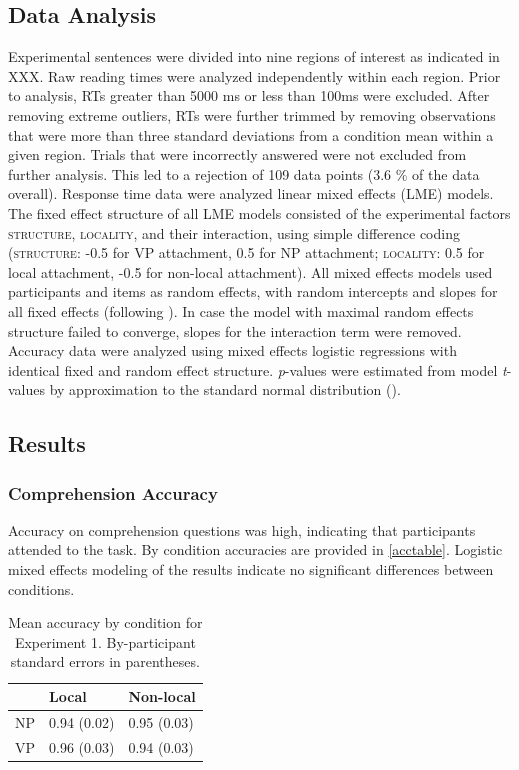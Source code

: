 \documentclass[12pt]{article}
\begin{document}
\subsection{Data Analysis}
\label{sec:analysis}

Experimental sentences were divided into nine regions of interest as indicated in XXX. Raw reading times were analyzed independently within each region. Prior to analysis, RTs greater than 5000 ms or less than 100ms were excluded. After removing extreme outliers, RTs were further trimmed by removing observations that were more than three standard deviations from a condition mean within a given region. Trials that were incorrectly answered were not excluded from further analysis. This led to a rejection of 109 data points (3.6 \% of the data overall). Response time data were analyzed linear mixed effects (LME) models. The fixed effect structure of all LME models consisted of the experimental factors \textsc{structure}, \textsc{locality}, and their interaction, using simple difference coding (\textsc{structure}: -0.5 for VP attachment,  0.5 for NP attachment;  \textsc{locality}: 0.5 for local attachment, -0.5 for non-local attachment). All mixed effects models used participants and items as random effects, with random intercepts and slopes for all fixed effects (following \cite{barr2013}). In case the model with maximal random effects structure failed to converge, slopes for the interaction term were removed. Accuracy data were analyzed using mixed effects logistic regressions with identical fixed and random effect structure. \textit{p}-values were estimated from model \textit{t}-values by approximation to the standard normal distribution (\cite{baayen2008}).   
  
\subsection{Results}
\label{sec:results}

\subsubsection{Comprehension Accuracy}
\label{sec:acc}

Accuracy on comprehension questions was high, indicating that participants attended to the task. By condition accuracies are provided in \ref{acctable}. Logistic mixed effects modeling of the results indicate no significant differences between conditions. 

\begin{table}[ht]
\centering
\begin{tabular}{rll}
  \hline
 & Local & Non-local \\ 
  \hline
NP & 0.94 (0.02) & 0.95 (0.03) \\ 
  VP & 0.96 (0.03) & 0.94 (0.03) \\ 
   \hline
\end{tabular}
\caption{Mean accuracy by condition for Experiment 1. By-participant standard errors in parentheses.} 
\end{table}
\end{document}
